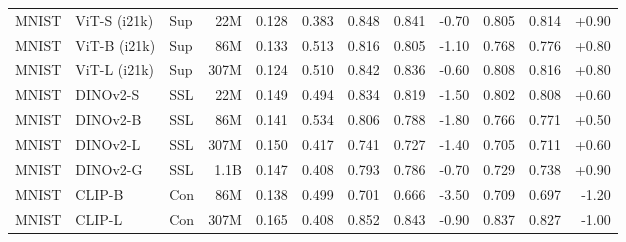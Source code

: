 \begin{table}[!htbp]
\begin{tabular}{lllrrr|rrr|rrr}
MNIST & ViT-S (i21k) & Sup & 22M & 0.128 & 0.383 & 0.848 & 0.841 & -0.70 & 0.805 & 0.814 & +0.90 \\
MNIST & ViT-B (i21k) & Sup & 86M & 0.133 & 0.513 & 0.816 & 0.805 & -1.10 & 0.768 & 0.776 & +0.80 \\
MNIST & ViT-L (i21k) & Sup & 307M & 0.124 & 0.510 & 0.842 & 0.836 & -0.60 & 0.808 & 0.816 & +0.80 \\
MNIST & DINOv2-S & SSL & 22M & 0.149 & 0.494 & 0.834 & 0.819 & -1.50 & 0.802 & 0.808 & +0.60 \\
MNIST & DINOv2-B & SSL & 86M & 0.141 & 0.534 & 0.806 & 0.788 & -1.80 & 0.766 & 0.771 & +0.50 \\
MNIST & DINOv2-L & SSL & 307M & 0.150 & 0.417 & 0.741 & 0.727 & -1.40 & 0.705 & 0.711 & +0.60 \\
MNIST & DINOv2-G & SSL & 1.1B & 0.147 & 0.408 & 0.793 & 0.786 & -0.70 & 0.729 & 0.738 & +0.90 \\
MNIST & CLIP-B & Con & 86M & 0.138 & 0.499 & 0.701 & 0.666 & -3.50 & 0.709 & 0.697 & -1.20 \\
MNIST & CLIP-L & Con & 307M & 0.165 & 0.408 & 0.852 & 0.843 & -0.90 & 0.837 & 0.827 & -1.00 \\
\bottomrule
\end{tabular}
\end{table}
